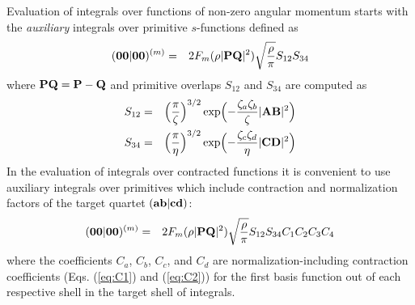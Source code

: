 \documentclass[10pt]{article}
\begin{document}
Evaluation of integrals over functions of non-zero angular momentum starts with the
{\em auxiliary} integrals over primitive $s$-functions
defined as
\begin{eqnarray}
\label{eq:0000m}
({\bf 00}|{\bf 00})^{(m)} & = & 2 F_m(\rho |{\bf PQ}|^2) \sqrt{\frac{\rho}{\pi}}S_{12}S_{34}
\end{eqnarray}
where ${\bf PQ} = {\bf P} - {\bf Q}$ and primitive overlaps $S_{12}$ and $S_{34}$
are computed as
\begin{eqnarray} \label{eq:S12}
S_{12} & = & \Bigl( \frac{\pi}{\zeta} \Bigr)^{3/2}
\exp \Bigl(-\frac{\zeta_a\zeta_b}{\zeta} |{\bf AB}|^2 \Bigr) \\
\label{eq:S34}
S_{34} & = & \Bigl( \frac{\pi}{\eta} \Bigr)^{3/2}
\exp \Bigl(-\frac{\zeta_c\zeta_d}{\eta} |{\bf CD}|^2 \Bigr)
\end{eqnarray}
In the evaluation of integrals over contracted functions it is convenient to
use auxiliary integrals over primitives which include contraction and normalization factors of the
target quartet $({\bf ab}|{\bf cd})$:
\begin{eqnarray} \label{eq:0000m_scaled}
({\bf 00}|{\bf 00})^{(m)} & = &  2 F_m(\rho |{\bf PQ}|^2) \sqrt{\frac{\rho}{\pi}}S_{12}S_{34}
C_1 C_2 C_3 C_4
\end{eqnarray}
where the coefficients $C_a$, $C_b$, $C_c$, and $C_d$ are
normalization-including contraction coefficients (Eqs. (\ref{eq:C1})
and (\ref{eq:C2})) for the first basis function out of each respective shell
in the target shell of integrals.



\end{document}
